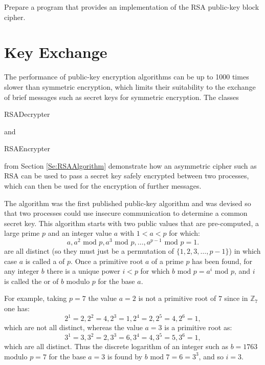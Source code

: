 \begin{exercise}
Prepare a program that provides an implementation of the RSA public-key block cipher.
\end{exercise}



\section{Key Exchange}
The performance of public-key encryption algorithms
can be up to 1000 times slower than symmetric encryption,
which limits their suitability to the exchange of
brief messages such as secret keys for symmetric encryption.
The classes \begin{code}RSADecrypter\end{code} and
\begin{code}RSAEncrypter\end{code} from Section \ref{Se:RSAAlgorithm}
demonstrate how an asymmetric cipher such as RSA can be used to pass a
secret key safely encrypted between two processes, which can then be
used for the encryption of further messages.

The  algorithm was the first published
public-key algorithm and was devised so that two processes could
use insecure communication to determine a common secret key.
This algorithm starts with two public values that are pre-computed,
a large prime $p$ and an integer value $a$ with $1<a<p$ for which:
\begin{displaymath}
  a, a^2\mbox{ mod }p, a^3\mbox{ mod }p, \dots, a^{p-1}\mbox{ mod }p=1.
\end{displaymath}
are all distinct (so they must just be a permutation of $\{1,2,3,\dots, p-1\}$)
in which case $a$ is called a  of $p$.
Once a primitive root $a$ of a prime $p$ has been found,
for any integer $b$ there is a unique power $i<p$
for which $b\mbox{ mod }p=a^i\mbox{ mod }p$, and $i$ is
called the  or  of $b$ modulo $p$ for
the base $a$.

For example, taking $p=7$ the value $a=2$ is not a primitive root of $7$ since in
$\mathbb{Z}_7$ one has:
\begin{displaymath}
  2^1=2, 2^2=4, 2^3=1, 2^4=2, 2^5=4, 2^6=1,
\end{displaymath}
which are not all distinct, whereas the value $a=3$ is a primitive root as:
\begin{displaymath}
  3^1=3, 3^2=2, 3^3=6, 3^4=4, 3^5=5, 3^6=1,
\end{displaymath}
which are all distinct.
Thus the discrete logarithm of an integer such as $b=1763$ modulo $p=7$ for the
base $a=3$ is found by $b\mbox{ mod }7=6=3^3$, and so $i=3$.

